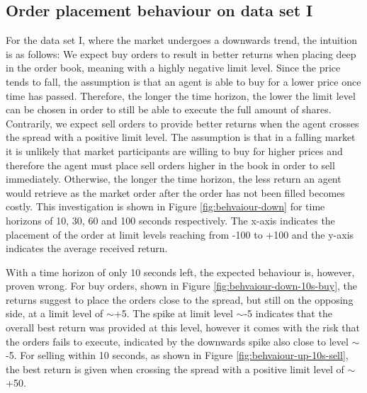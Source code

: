 \subsection{Order placement behaviour on data set I}
For the data set I, where the market undergoes a downwards trend, the intuition is as follows:
We expect buy orders to result in better returns when placing deep in the order book, meaning with a highly negative limit level.
Since the price tends to fall, the assumption is that an agent is able to buy for a lower price once time has passed.
Therefore, the longer the time horizon, the lower the limit level can be chosen in order to still be able to execute the full amount of shares.
Contrarily, we expect sell orders to provide better returns when the agent crosses the spread with a positive limit level.
The assumption is that in a falling market it is unlikely that market participants are willing to buy for higher prices and therefore the agent must place sell orders higher in the book in order to sell immediately.
Otherwise, the longer the time horizon, the less return an agent would retrieve as the market order after the order has not been filled becomes costly.
This investigation is shown in Figure \ref{fig:behvaiour-down} for time horizons of 10, 30, 60 and 100 seconds respectively.
The x-axis indicates the placement of the order at limit levels reaching from -100 to +100 and the y-axis indicates the average received return.

With a time horizon of only 10 seconds left, the expected behaviour is, however, proven wrong.
For buy orders, shown in Figure \ref{fig:behvaiour-down-10s-buy}, the returns suggest to place the orders close to the spread, but still on the opposing side, at a limit level of $\sim$+5.
The spike at limit level $\sim$-5 indicates that the overall best return was provided at this level, however it comes with the risk that the orders fails to execute, indicated by the downwards spike also close to level $\sim$-5.
For selling within 10 seconds, as shown in Figure \ref{fig:behvaiour-up-10s-sell}, the best return is given when crossing the spread with a positive limit level of $\sim$+50.


